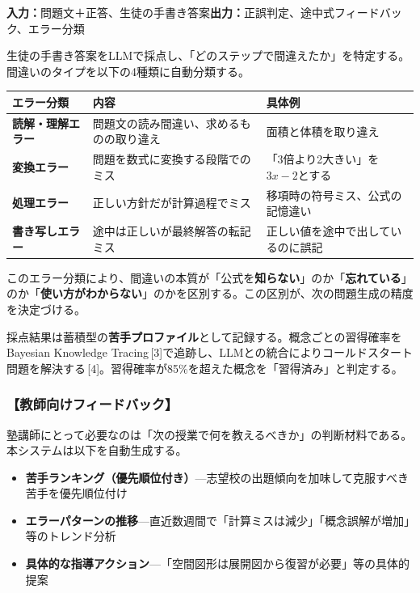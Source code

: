 \documentclass[paper=a4,fontsize=10.5bp,jafontsize=10.5bp,twocolumn]{jlreq}
\begin{document}
\noindent\textbf{入力：}問題文＋正答、生徒の手書き答案\quad\textbf{出力：}正誤判定、途中式フィードバック、エラー分類

生徒の手書き答案をLLMで採点し、「どのステップで間違えたか」を特定する。間違いのタイプを以下の4種類に自動分類する。


\begin{footnotesize}\noindent
\begin{tabularx}{\linewidth}{>{\bfseries}l X X}
\toprule
エラー分類 & 内容 & 具体例 \\
\midrule
読解・理解エラー & 問題文の読み間違い、求めるものの取り違え & 面積と体積を取り違え \\
変換エラー & 問題を数式に変換する段階でのミス & 「3倍より2大きい」を$3x-2$とする \\
処理エラー & 正しい方針だが計算過程でミス & 移項時の符号ミス、公式の記憶違い \\
書き写しエラー & 途中は正しいが最終解答の転記ミス & 正しい値を途中で出しているのに誤記 \\
\bottomrule
\end{tabularx}
\end{footnotesize}


このエラー分類により、間違いの本質が「公式を\textbf{知らない}」のか「\textbf{忘れている}」のか「\textbf{使い方がわからない}」のかを区別する。この区別が、次の問題生成の精度を決定づける。

採点結果は蓄積型の\textbf{苦手プロファイル}として記録する。概念ごとの習得確率をBayesian Knowledge Tracing\,[3]で追跡し、LLMとの統合によりコールドスタート問題を解決する\,[4]。習得確率が85\%を超えた概念を「習得済み」と判定する。

\subsubsection{【教師向けフィードバック】}

塾講師にとって必要なのは「次の授業で何を教えるべきか」の判断材料である。本システムは以下を自動生成する。

\begin{itemize}
  \item \textbf{苦手ランキング（優先順位付き）}---志望校の出題傾向を加味して克服すべき苦手を優先順位付け
  \item \textbf{エラーパターンの推移}---直近数週間で「計算ミスは減少」「概念誤解が増加」等のトレンド分析
  \item \textbf{具体的な指導アクション}---「空間図形は展開図から復習が必要」等の具体的提案
\end{itemize}
\end{document}
